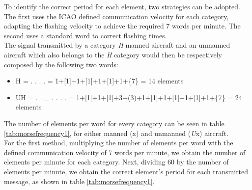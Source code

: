To identify the correct period for each element, two strategies can be adopted. The first uses the ICAO defined communication velocity for each category, adapting the flashing velocity to achieve the required 7 words per minute. The second uses a standard word to correct flashing times.\\
The signal transmitted by a category \textit{H} manned aircraft and an unmanned aircraft which also belongs to the \textit{H} category would then be respectively composed by the following two words:
\begin{itemize}
  \item[] H = . . . . = 1+[1]+1+[1]+1+[1]+1+\{7\} = 14 elements
  \item[] UH = . . \_ \space\space\space . . . . = 1+[1]+1+[1]+3+(3)+1+[1]+1+[1]+1+[1]+1+\{7\} = 24 elements
\end{itemize}
The number of elements per word for every category can be seen in table \ref{tab:morsefrequency1}, for either manned (x) and unmanned (\textit{U}x) aircraft.\\
For the first method, multiplying the number of elements per word with the defined communication velocity of 7 words per minute, we obtain the number of elements per minute for each category. Next, dividing 60 by the number of elements per minute, we obtain the correct element's period for each transmitted message, as shown in table \ref{tab:morsefrequency1}.
